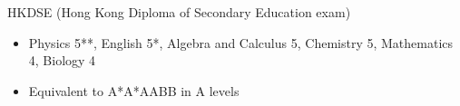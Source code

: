 \documentclass[a4paper, 12pt]{article}
\newcommand{\expentry}[3]{\emph{#1}\hfill{#2}---{#3}}
\begin{document}
    HKDSE (Hong Kong Diploma of Secondary Education exam)
    \begin{itemize}
    \setlength\itemsep{0em}
    \item Physics 5**, English 5*, Algebra and Calculus 5, Chemistry 5, Mathematics 4, Biology 4
    \item Equivalent to A*A*AABB in A levels
    \end{itemize}
\end{document}

